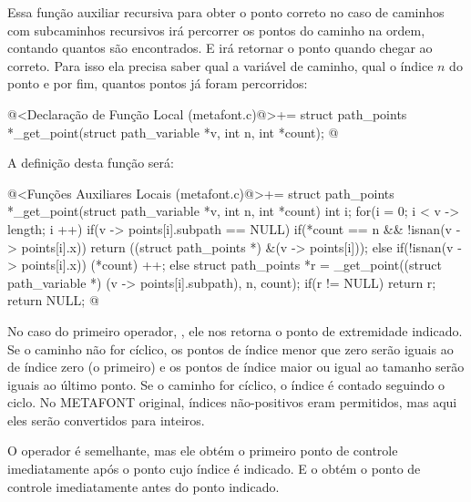 {Essa função auxiliar recursiva para obter o ponto correto no caso de
caminhos com subcaminhos recursivos irá percorrer os pontos do caminho
na ordem, contando quantos são encontrados. E irá retornar o ponto
quando chegar ao correto. Para isso ela precisa saber qual a variável
de caminho, qual o índice $n$ do ponto e por fim, quantos pontos já
foram percorridos:

\iniciocodigo
@<Declaração de Função Local (metafont.c)@>+=
struct path_points *_get_point(struct path_variable *v, int n, int *count);
@
\fimcodigo

A definição desta função será:

\iniciocodigo
@<Funções Auxiliares Locais (metafont.c)@>+=
struct path_points *_get_point(struct path_variable *v, int n, int *count){
  int i;
  for(i = 0; i < v -> length; i ++){
    if(v -> points[i].subpath == NULL) {
      if(*count == n && !isnan(v -> points[i].x))
	return ((struct path_points *) &(v -> points[i]));
      else if(!isnan(v -> points[i].x))
	(*count) ++;
    }
    else{
      struct path_points *r =
	_get_point((struct path_variable *) (v -> points[i].subpath),
		   n, count);
      if(r != NULL)
	return r;
    }
  }
  return NULL;
}
@
\fimcodigo


No caso do primeiro operador, , ele nos retorna o
ponto de extremidade indicado. Se o caminho não for cíclico, os pontos
de índice menor que zero serão iguais ao de índice zero (o primeiro) e
os pontos de índice maior ou igual ao tamanho serão iguais ao último
ponto. Se o caminho for cíclico, o índice é contado seguindo o
ciclo. No METAFONT original, índices não-positivos eram permitidos,
mas aqui eles serão convertidos para inteiros.

O operador  é semelhante, mas ele obtém o
primeiro ponto de controle imediatamente após o ponto cujo índice é
indicado. E o  obtém o ponto de controle
imediatamente antes do ponto indicado.

}
